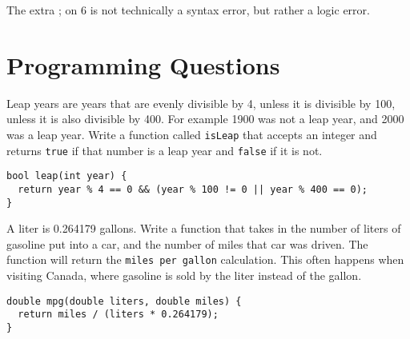 \documentclass[11pt,answers]{exam}
\begin{document}
\begin{questions}
\begin{solution}
  The extra ; on 6 is not technically a syntax error, but rather a logic error.
\end{solution}

\newpage
\section*{Programming Questions}

\question[12] Leap years are years that are evenly divisible by 4, unless it is divisible by 100, unless it is also divisible by 400. For example 1900 was not a leap year, and 2000 was a leap year. Write a function called {\tt isLeap} that accepts an integer and returns {\tt true} if that number is a leap year and {\tt false} if it is not.

\begin{solution}
 \begin{lstlisting}
bool leap(int year) {
  return year % 4 == 0 && (year % 100 != 0 || year % 400 == 0);
}   
 \end{lstlisting}
\end{solution}

\newpage
\question[12] A liter is 0.264179 gallons. Write a function that takes in the number of liters of gasoline put into a car, and the number of miles that car was driven. The function will return the {\tt miles per gallon} calculation. This often happens when visiting Canada, where gasoline is sold by the liter instead of the gallon.

\begin{solution}
\begin{lstlisting}
double mpg(double liters, double miles) {
  return miles / (liters * 0.264179);
}
\end{lstlisting}  
\end{solution}


\end{questions}
\end{document}
